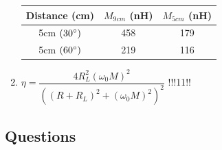 \documentclass{article}
\begin{document}
\begin{enumerate}
	\begin{table}[h]
	\centering
		\begin{tabular}{|c|c|c|}
		\hline
		Distance (cm)	  & $M_{9cm}$ (nH) & $M_{5cm}$ (nH) \\ \hline
		5cm $(30\degree)$ & 458 		   & 179   			\\ \hline
		5cm $(60\degree)$ & 219 		   & 116 		    \\ \hline
		\end{tabular}
	\end{table}

	\item $\eta = \dfrac{4R_L^2(\omega_0M)^2}{((R+R_L)^2+(\omega_0M)^2)^2}$ !!!11!!
\end{enumerate}

\subsection{Questions}
\end{document}
